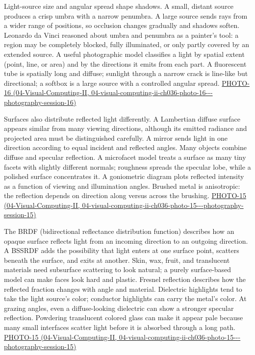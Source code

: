 Light-source size and angular spread shape shadows. A small, distant source produces a crisp umbra with a narrow penumbra. A large source sends rays from a wider range of positions, so occlusion changes gradually and shadows soften. Leonardo da Vinci reasoned about umbra and penumbra as a painter's tool: a region may be completely blocked, fully illuminated, or only partly covered by an extended source. A useful photographic model classifies a light by spatial extent (point, line, or area) and by the directions it emits from each part. A fluorescent tube is spatially long and diffuse; sunlight through a narrow crack is line-like but directional; a softbox is a large source with a controlled angular spread. \href{../04-Visual-Computing-II/main.pdf\#nameddest=04-visual-computing-ii-ch036-photo-16---photography-session-16}{PHOTO-16 (04-Visual-Computing-II, 04-visual-computing-ii-ch036-photo-16-\/-\/-photography-session-16)}

Surfaces also distribute reflected light differently. A Lambertian diffuse surface appears similar from many viewing directions, although its emitted radiance and projected area must be distinguished carefully. A mirror sends light in one direction according to equal incident and reflected angles. Many objects combine diffuse and specular reflection. A microfacet model treats a surface as many tiny facets with slightly different normals; roughness spreads the specular lobe, while a polished surface concentrates it. A goniometric diagram plots reflected intensity as a function of viewing and illumination angles. Brushed metal is anisotropic: the reflection depends on direction along versus across the brushing. \href{../04-Visual-Computing-II/main.pdf\#nameddest=04-visual-computing-ii-ch036-photo-15---photography-session-15}{PHOTO-15 (04-Visual-Computing-II, 04-visual-computing-ii-ch036-photo-15-\/-\/-photography-session-15)}

The BRDF (bidirectional reflectance distribution function) describes how an opaque surface reflects light from an incoming direction to an outgoing direction. A BSSRDF adds the possibility that light enters at one surface point, scatters beneath the surface, and exits at another. Skin, wax, fruit, and translucent materials need subsurface scattering to look natural; a purely surface-based model can make faces look hard and plastic. Fresnel reflection describes how the reflected fraction changes with angle and material. Dielectric highlights tend to take the light source's color; conductor highlights can carry the metal's color. At grazing angles, even a diffuse-looking dielectric can show a stronger specular reflection. Powdering translucent colored glass can make it appear pale because many small interfaces scatter light before it is absorbed through a long path. \href{../04-Visual-Computing-II/main.pdf\#nameddest=04-visual-computing-ii-ch036-photo-15---photography-session-15}{PHOTO-15 (04-Visual-Computing-II, 04-visual-computing-ii-ch036-photo-15-\/-\/-photography-session-15)}

